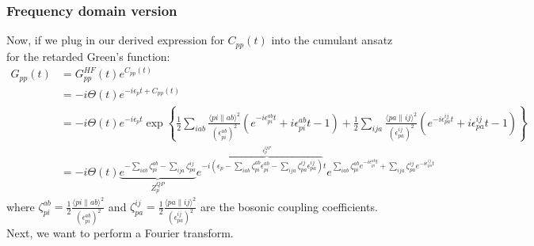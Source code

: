 \subsubsection{Frequency domain version}
Now, if we plug in our derived expression for $C_{pp}(t)$ into the cumulant ansatz for the retarded Green's function:
\begin{align}
G_{pp}(t) & = G_{pp}^{HF}(t) e^{C_{pp}(t)} \\
& = -i \Theta(t) e^{-i \epsilon_p t + C_{pp}(t)} \\
& = -i \Theta(t) e^{-i \epsilon_p t} \exp\left\{ \frac{1}{2} \sum_{i a b}\frac{\langle p i \| a b\rangle^2 }{\left(\epsilon_{p i}^{a b}\right)^2}\left(e^{-i \epsilon_{p i}^{a b} t} +i \epsilon_{p i}^{a b} t -1 \right) +\frac{1}{2}\sum_{i j a} \frac{\langle p a \| i j\rangle^2}{\left(\epsilon_{p a}^{i j}\right)^2} \left(e^{-i \epsilon_{p a}^{i j} t} +i \epsilon_{p a}^{i j} t -1 \right) \right\} \\
&= -i \Theta(t) \underbrace{e^{-\sum_{i a b} \zeta_{pi}^{ab} - \sum_{i j a} \zeta_{pa}^{ij}}}_{Z_p^{QP}} e^{-i\overbrace{\left(\epsilon_p - \sum_{i a b} \zeta_{pi}^{ab}\epsilon_{pi}^{ab} - \sum_{i j a} \zeta_{pa}^{ij}\epsilon_{pa}^{ij}\right)}^{\epsilon_p^{QP}} t} e^{\sum_{i a b} \zeta_{pi}^{ab} e^{-i\epsilon_{pi}^{ab} t} + \sum_{i j a} \zeta_{pa}^{ij} e^{-i\epsilon_{pa}^{ij} t}}
\end{align}
where $\zeta_{pi}^{ab} = \frac{1}{2} \frac{\langle p i \| a b\rangle^2}{\left(\epsilon_{p i}^{a b}\right)^2}$ and $\zeta_{pa}^{ij} = \frac{1}{2} \frac{\langle p a \| i j\rangle^2}{\left(\epsilon_{p a}^{i j}\right)^2}$ are the bosonic coupling coefficients.
 Next, we want to perform a Fourier transform.
